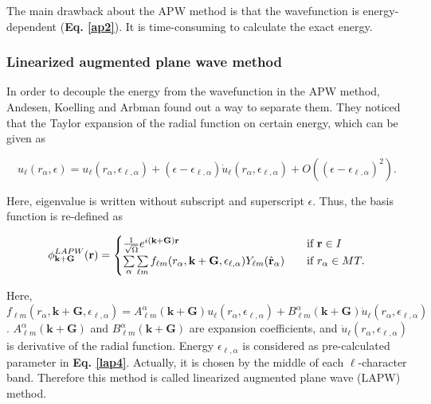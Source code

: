 \documentclass[a4paper, 12pt, titlepage,oneside,drop]{kthesis}
\begin{document}
The main drawback about the APW method is that the wavefunction is energy-dependent (\textbf{Eq. \ref{ap2}}). It is time-consuming to calculate the exact energy.

\subsubsection{Linearized augmented plane wave method}
\noindent In order to decouple the energy from the wavefunction in the APW method, Andesen, Koelling and Arbman found out a way to separate them. They noticed that the Taylor expansion of the radial function
on certain energy, which can be given as

\begin{equation}\label{ap3}
 u_{{\ell}}(r_{\alpha}, \epsilon) = u_{{\ell}}(r_{\alpha}, \epsilon_{\ell,\alpha}) + (\epsilon-\epsilon_{\ell,\alpha}) \dot{u}_{{\ell}}(r_{\alpha}, \epsilon_{\ell,\alpha}) + O((\epsilon-\epsilon_{\ell,\alpha})^2).
\end{equation}

Here, eigenvalue is written without subscript and superscript $\epsilon$. Thus, the basis function is re-defined as 

\begin{equation}\label{lap4}
\phi^{LAPW}_{\textbf{k}+\textbf{G}} (\textbf{r}) = 
\begin{cases} \frac {1}{\sqrt{\Omega}} e^{i(\textbf{k}+\textbf{G})\textbf{r}} & \quad \mbox{if $\textbf{r} \in {I} $}
\\
\sumg<\alpha>\sum\limits_{{\ell}m} f_{{\ell}{m}} (r_{\alpha},\textbf{k}+\textbf{G}, \epsilon_{\ell,\alpha}) Y_{{\ell}m}(\hat{\textbf{r}}_{\alpha})  & \quad \mbox{if $r_{\alpha} \in MT. $}\\ 
\end{cases}
\end{equation}

Here, $f_{{\ell}{m}} (r_{\alpha},\textbf{k}+\textbf{G}, \epsilon_{\ell,\alpha}) =  A _{{\ell}m}^{\alpha} (\textbf {k}+\textbf{G}) u_{{\ell}}(r_{\alpha}, \epsilon_{\ell,\alpha}) + B _{{\ell}m}^{\alpha} (\textbf {k}+\textbf{G}) \dot{u}_{{\ell}}(r_{\alpha}, \epsilon_{\ell,\alpha})$
. $A _{{\ell}m}^{\alpha} (\textbf {k}+\textbf{G})$ and $B _{{\ell}m}^{\alpha} (\textbf {k}+\textbf{G})$ are expansion coefficients, and $\dot{u}_{{\ell}}(r_{\alpha}, \epsilon_{\ell,\alpha} )$ is derivative of the radial 
function. Energy $\epsilon_{\ell,\alpha}$  is considered as pre-calculated parameter in \textbf{Eq. \ref{lap4}}. Actually, it is chosen by the middle of  each $\ell$-character band. Therefore this method is called linearized
augmented plane wave (LAPW) method.
\end{document}
